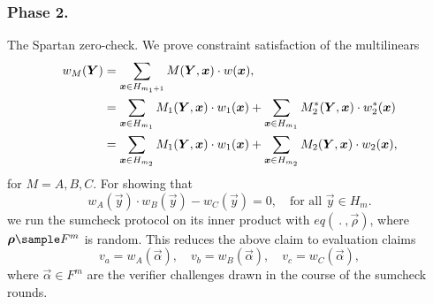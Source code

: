 \subsubsection{Phase 2.}
The Spartan zero-check.
We prove constraint satisfaction of the multilinears
\begin{align}
\label{e:a:poly}
w_M(\vec Y) &= 
\sum_{\vec x\in H_{m_1+1}} M(\vec Y, \vec x)\cdot w(\vec x), 
\\\notag
&= \sum_{\vec x\in H_{m_1}} M_1(\vec Y, \vec x)\cdot w_1(\vec x) + \sum_{\vec x\in H_{m_1}} M_2^*(\vec Y,\vec x) \cdot w_2^*(\vec x)
\\\notag
&= \sum_{\vec x\in H_{m_2}} M_1(\vec Y, \vec x)\cdot w_1(\vec x) + \sum_{\vec x\in H_{m_2}} M_2(\vec Y,\vec x) \cdot w_2(\vec x),
\end{align}
for $M=A,B,C$.
%
For showing that
\begin{equation*}
w_A(\vec y)\cdot w_B(\vec y) - w_C(\vec y) = 0, \quad \text{for all }\vec y \in H_m.
\end{equation*}
we run the sumcheck protocol on its inner product with $eq(\:.\:,\vec\rho)$, where $\vec\rho\sample F^m$ is random.
This reduces the above claim to evaluation claims 
\begin{equation}
\label{e:image:polys:evals}
v_a = w_A(\vec \alpha),\quad v_b = w_B(\vec\alpha),\quad v_c = w_C(\vec\alpha),
\end{equation}
where  $\vec\alpha\in F^m$ are the verifier challenges drawn in the course of the sumcheck rounds.

